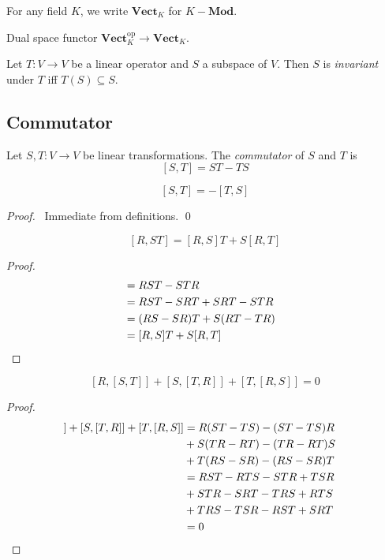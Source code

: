 \begin{df}
For any field $K$, we write $\mathbf{Vect}_K$ for $K-\mathbf{Mod}$.
\end{df}

Dual space functor $\mathbf{Vect}_K^{\mathrm{op}} \rightarrow \mathbf{Vect}_K$.

\begin{df}[Invariant]
Let $T : V \rightarrow V$ be a linear operator and $S$ a subspace of $V$. Then $S$ is \emph{invariant} under $T$ iff $T(S) \subseteq S$.
\end{df}

\subsection{Commutator}

\begin{df}[Commutator]
Let $S,T : V \rightarrow V$ be linear transformations. The \emph{commutator} of $S$ and $T$ is
\[ [S,T] = ST - TS \]
\end{df}

\begin{prop}
\[ [S,T] = -[T,S] \]
\end{prop}

\begin{proof}
\pf\ Immediate from definitions. \qed
\end{proof}

\begin{prop}
\[ [R,ST] = [R,S]T + S[R,T] \]
\end{prop}

\begin{proof}
\pf
\begin{align*}
[R,ST] & = RST - STR \\
& = RST - SRT + SRT - STR \\
& = (RS - SR) T + S(RT - TR) \\
& = [R,S]T + S[R,T] & \qed
\end{align*}
\end{proof}

\begin{prop}
\[ [R, [S,T]] + [S,[T,R]] + [T,[R,S]] = 0 \]
\end{prop}

\begin{proof}
\pf
\begin{align*}
[R,[S,T]] + [S,[T,R]] + [T,[R,S]]
& = R(ST-TS) - (ST-TS)R \\
& + S(TR - RT) - (TR - RT)S \\
& + T(RS - SR) - (RS - SR)T \\
& = RST - RTS - STR + TSR \\
& + STR - SRT - TRS + RTS \\
& + TRS - TSR - RST + SRT \\
& = 0 & \qed
\end{align*}
\end{proof}
